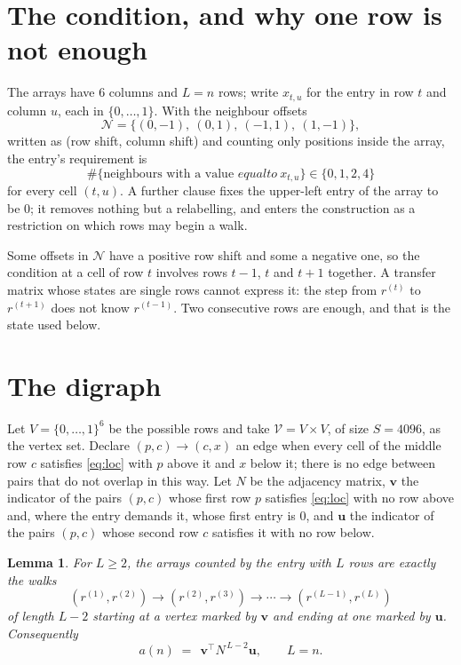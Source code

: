 \documentclass[11pt,a4paper]{article}
\theoremstyle{plain}
\newtheorem{lemma}[theorem]{Lemma}
\theoremstyle{definition}
\begin{document}
\section{The condition, and why one row is not enough}

The arrays have $6$ columns and $L=n$ rows; write $x_{t,u}$ for the entry in
row $t$ and column $u$, each in $\{0,\dots,1\}$. With the neighbour offsets
\[
\mathcal N=\{(0,-1),\ (0,1),\ (-1,1),\ (1,-1)\},
\]
written as (row shift, column shift) and counting only positions inside the array, the
entry's requirement is
\begin{equation}\label{eq:loc}
\#\{\text{neighbours with a value }equal to\ x_{t,u}\}\in\{0,1,2,4\}
\end{equation}
for every cell $(t,u)$. A further clause fixes the upper-left entry of the array to be $0$; it removes nothing but a relabelling, and enters the construction as a restriction on which rows may begin a walk.

Some offsets in $\mathcal N$ have a positive row shift and some a negative one, so the
condition at a cell of row $t$ involves rows $t-1$, $t$ and $t+1$ together. A transfer
matrix whose states are single rows cannot express it: the step from $r^{(t)}$ to
$r^{(t+1)}$ does not know $r^{(t-1)}$. Two consecutive rows are enough, and that is
the state used below.

\section{The digraph}

Let $V=\{0,\dots,1\}^{6}$ be the possible rows and take
$\mathcal V=V\times V$, of size $S=4096$, as the vertex set. Declare $(p,c)\to(c,x)$ an edge
when every cell of the middle row $c$ satisfies \eqref{eq:loc} with $p$ above it and $x$
below it; there is no edge between pairs that do not overlap in this way. Let $N$ be the
adjacency matrix, $\mathbf{v}$ the indicator of the pairs $(p,c)$ whose first row $p$
satisfies \eqref{eq:loc} with no row above and, where the entry demands it, whose first entry is $0$, and $\mathbf{u}$ the indicator of
the pairs $(p,c)$ whose second row $c$ satisfies it with no row below.

\begin{lemma}\label{lem:walk}
For $L\ge2$, the arrays counted by the entry with $L$ rows are exactly the walks
\[
(r^{(1)},r^{(2)})\to(r^{(2)},r^{(3)})\to\cdots\to(r^{(L-1)},r^{(L)})
\]
of length $L-2$ starting at a vertex marked by $\mathbf{v}$ and ending at one marked by
$\mathbf{u}$. Consequently
\[
a(n)\;=\;\,\mathbf{v}^{\!\top}N^{\,L-2}\mathbf{u},\qquad L=n .
\]
\end{lemma}
\end{document}
